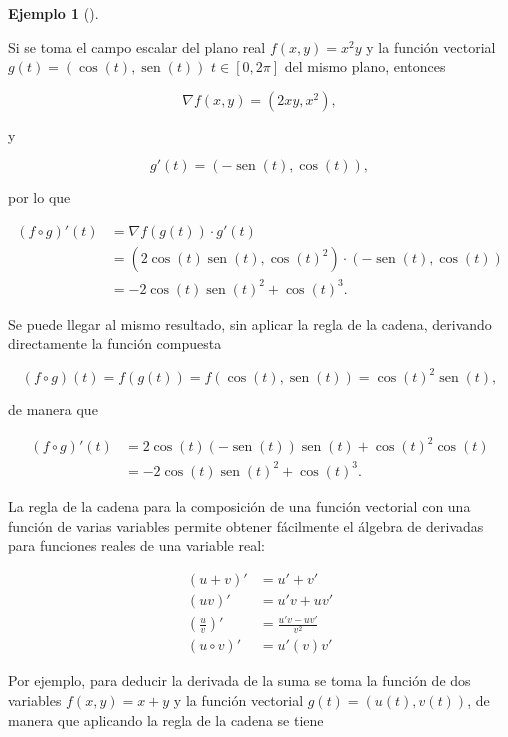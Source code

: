 \documentclass[
  a4paper,
]{scrreport}
\theoremstyle{definition}
\theoremstyle{definition}
\newtheorem{example}{Ejemplo}[chapter]
\theoremstyle{definition}
\theoremstyle{plain}
\theoremstyle{plain}
\theoremstyle{plain}
\theoremstyle{remark}
\begin{document}
\begin{example}[]\protect\hypertarget{exm-regla-cadena}{}\label{exm-regla-cadena}

Si se toma el campo escalar del plano real \(f(x,y)=x^2y\) y la función
vectorial \(g(t)=(\cos(t),\operatorname{sen}(t))\) \(t\in [0,2\pi]\) del
mismo plano, entonces

\[
\nabla f(x,y) = (2xy, x^2),
\]

y

\[
g'(t) = (-\operatorname{sen}(t), \cos(t)),
\]

por lo que

\begin{align*}
(f\circ g)'(t) 
&= \nabla f(g(t))\cdot g'(t) \\
&= (2\cos(t)\operatorname{sen}(t),\cos(t)^2)\cdot (-\operatorname{sen}(t),\cos(t)) \\
&= -2\cos(t)\operatorname{sen}(t)^2+\cos(t)^3.
\end{align*}

Se puede llegar al mismo resultado, sin aplicar la regla de la cadena,
derivando directamente la función compuesta

\[
(f\circ g)(t) = f(g(t)) = f(\cos(t), \operatorname{sen}(t)) = \cos(t)^2\operatorname{sen}(t),
\]

de manera que

\begin{align*}
(f\circ g)'(t) 
&= 2\cos(t)(-\operatorname{sen}(t))\operatorname{sen}(t)+\cos(t)^2 \cos(t)\\
&= -2\cos(t)\operatorname{sen}(t)^2+\cos(t)^3.
\end{align*}

\end{example}

La regla de la cadena para la composición de una función vectorial con
una función de varias variables permite obtener fácilmente el álgebra de
derivadas para funciones reales de una variable real:

\[
\begin{aligned}
(u+v)' &= u'+v'\\
(uv)' &= u'v+uv'\\
\left(\frac{u}{v}\right)' &= \frac{u'v-uv'}{v^2}\\
(u\circ v)' &= u'(v)v'
\end{aligned}
\]

Por ejemplo, para deducir la derivada de la suma se toma la función de
dos variables \(f(x,y)=x+y\) y la función vectorial
\(g(t)=(u(t),v(t))\), de manera que aplicando la regla de la cadena se
tiene
\end{document}
